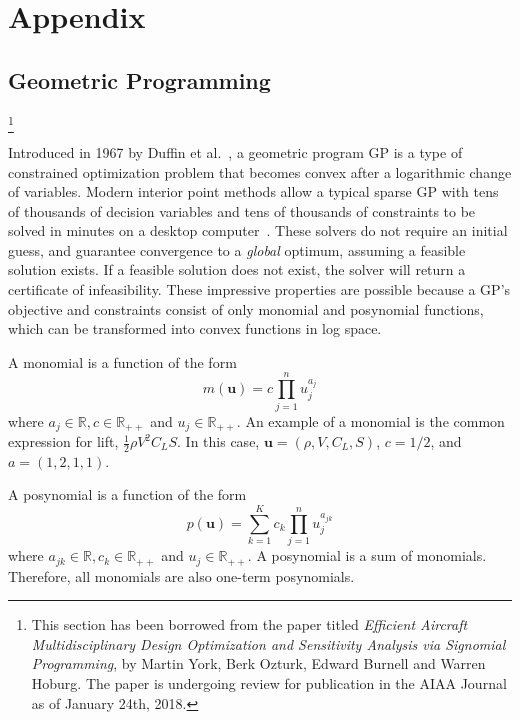 \chapter{Appendix}
\label{app}

\section{Geometric Programming}\footnote{This section has been borrowed from the paper
titled \textit{Efficient Aircraft Multidisciplinary Design Optimization and Sensitivity Analysis via Signomial Programming},
by Martin York, Berk Ozturk, Edward Burnell and Warren Hoburg.
The paper is undergoing review for publication in the AIAA Journal as of January 24th, 2018. }
\label{a:gpintro}

Introduced in 1967 by Duffin et al.~\cite{duffingp}, a geometric program \gls{GP} is
a type of constrained optimization problem that becomes convex after a
logarithmic change of variables. Modern interior point methods allow a typical
sparse \gls{GP} with tens of thousands of decision variables and tens of thousands of
constraints to be solved in minutes on a desktop computer~\cite{convex}. These
solvers do not require an initial guess, and guarantee convergence to a
\textit{global} optimum, assuming a feasible solution exists. If a feasible
solution does not exist, the solver will return a certificate of infeasibility.
These impressive properties are possible because a GP's objective and
constraints consist of only monomial and posynomial functions, which can be
transformed into convex functions in log space.

A monomial is a function of the form
\begin{equation}\label{e:monomial}
m(\mathbf{u}) = c\prod_{j=1}^{n} u_{j}^{a_{j}}
\end{equation}
where $a_{j} \in \mathbb{R}, c \in \mathbb{R}_{++}$ and $u_{j} \in
\mathbb{R_{++}}$. An example of a monomial is the common expression for lift,
$\frac{1}{2} \rho V^2C_{L}S$. In this case, $\mathbf{u} = (\rho, V, C_{L}, S)$,
$c= 1/2$, and $a = (1, 2, 1, 1)$.

A posynomial is a function of the form
\begin{equation}\label{e:posynomial}
p(\mathbf{u}) = \sum_{k=1}^{K}c_{k}\prod_{j=1}^{n} u_{j}^{a_{jk}}
\end{equation}
where $a_{jk} \in \mathbb{R}, c_{k} \in \mathbb{R}_{++}$ and $u_{j} \in
\mathbb{R_{++}}$. A posynomial is a sum of monomials. Therefore, all monomials
are also one-term posynomials.

